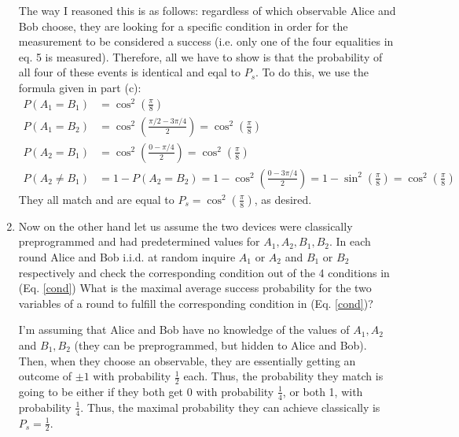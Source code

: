 \documentclass[10pt]{article}
\begin{document}
\begin{enumerate}[label=\alph*)]
			\begin{solution}
				The way I reasoned this is as follows: regardless of which observable Alice and 
				Bob choose, they are looking for a specific condition in order for the measurement to be 
				considered a success (i.e. only one of the four equalities in eq. 5 is measured). Therefore, 
				all we have to show is that the probability of all four of these events is 
				identical and eqal to \( P_s \). To do this, we use the formula given in part (c): 
				\begin{align*}
					P(A_1 = B_1) &= \cos^2\left(\frac{\pi}{8}\right)\\
					P(A_1 = B_2) &= \cos^2\left( \frac{\pi / 2 - 3 \pi /4}{2} \right)  = \cos^2
					\left( \frac{\pi}{8} \right) \\
					P(A_2 = B_1) &= \cos^2\left( \frac{0 - \pi /4}{2} \right) = \cos^2\left( \frac{\pi}{8} \right) \\
					P(A_2 \neq B_1) &= 1 - P(A_2 = B_2) = 1 - \cos^2\left( \frac{0 - 3 \pi /4}{2} \right) = 
					1 - \sin^2\left( \frac{\pi}{8} \right)  = \cos^2\left( \frac{\pi}{8} \right) 
				\end{align*}	
				They all match and are equal to \( P_s = \cos^2\left( \frac{\pi}{8}\right)  \), as desired. 
			\end{solution}
		\item Now on the other hand let us assume the two devices were classically preprogrammed and had predetermined
			values for \( A_1, A_2, B_1, B_2 \). In each round Alice and Bob i.i.d. at random inquire 
			\( A_1 \) or \( A_2 \) and \( B_1 \) or \( B_2 \) respectively and check the corresponding condition out 
			of the 4 conditions in (Eq. \ref{cond}) 
			What is the maximal average success probability for the two variables
			of a round to fulfill the corresponding condition in (Eq. \ref{cond})?

			\begin{solution}
				I'm assuming that Alice and Bob have no knowledge of the values 
				of \( A_1, A_2 \) and \( B_1, B_2 \) (they can be preprogrammed, but hidden to Alice and Bob). 
				Then, when they choose an observable, they are essentially getting an outcome of \( \pm 1 \) 
				with probability \( \frac{1}{2} \) each. Thus, the probability they match is going to be either 
				if they both get 0 with probability \( \frac{1}{4} \), or both 1, with probability \( \frac{1}{4} \). 
				Thus, the maximal probability they can achieve classically is \( P_s = \frac{1}{2} \).
			\end{solution}
	\end{enumerate}
	\pagebreak
\end{document}
